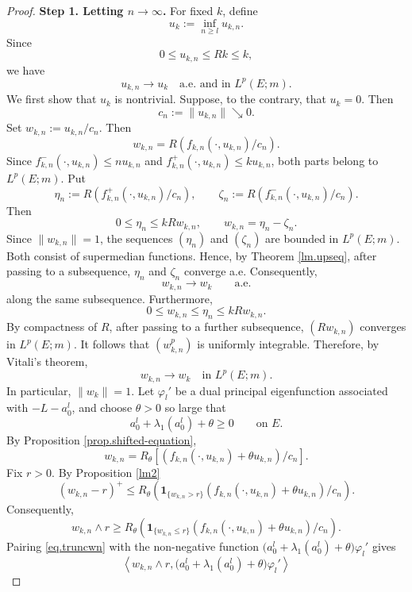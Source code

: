 \documentclass[10pt,a4paper]{amsart}
\begin{document}
\begin{proof}
{\bf Step 1. Letting $n\to\infty$.}  For fixed $k$, define
\[
u_k:=\inf_{n\ge l}u_{k,n}.
\]
Since
\[
0\le u_{k,n}\le Rk\le k,
\]
we have
\begin{equation}
\label{eq.untoUK}
u_{k,n}\longrightarrow u_k
\quad\text{a.e. and in }L^p(E;m).
\end{equation}
We first show that $u_k$ is nontrivial. Suppose, to the contrary,
that $u_k=0$. Then
\[
c_n:=\|u_{k,n}\|\searrow0.
\]
Set $w_{k,n}:=u_{k,n}/c_n$. Then 
\[
w_{k,n}
=
R\left(f_{k,n}(\cdot,u_{k,n})/c_n
\right).
\]
Since $f_{k,n}^-(\cdot,u_{k,n})\le n u_{k,n}$ and
$f_{k,n}^+(\cdot,u_{k,n})\le k u_{k,n} $, both parts belong to
$L^p(E;m)$.
Put
\[
\eta_n
:=
R\left(
f_{k,n}^+(\cdot,u_{k,n})/c_n
\right),
\qquad
\zeta_n
:=
R\left(
f_{k,n}^-(\cdot,u_{k,n})/c_n
\right).
\]
Then
\[
0\le \eta_n\le kRw_{k,n},
\qquad
w_{k,n}=\eta_n-\zeta_n.
\]
Since $\|w_{k,n}\|=1$, the sequences $(\eta_n)$ and $(\zeta_n)$ are
bounded in $L^p(E;m)$. Both consist of supermedian functions.
Hence, by Theorem \ref{lm.upseq}, after passing to a subsequence,
$\eta_n$ and $\zeta_n$ converge a.e. Consequently,
\[
w_{k,n}\longrightarrow w_k
\qquad\text{a.e.}
\]
along the same subsequence.
Furthermore,
\[
0\le w_{k,n}\le \eta_n\le kRw_{k,n}.
\]
By compactness of $R$, after passing to a further subsequence,
$(Rw_{k,n})$ converges in $L^p(E;m)$. It follows that
$(w_{k,n}^p)$ is uniformly integrable. Therefore, by Vitali's
theorem,
\begin{equation}
\label{eq.wnstrong}
w_{k,n}\longrightarrow w_k
\quad\text{in }L^p(E;m).
\end{equation}
In particular, $\|w_k\|=1$.
Let $\varphi_l'$ be a dual principal eigenfunction associated with
$-L-a_0^l$, and choose $\theta>0$ so large that
\[
a_0^l+\lambda_1(a_0^l)+\theta\ge0
\qquad\text{on }E.
\]
By Proposition \ref{prop.shifted-equation},
\[
w_{k,n}
=
R_\theta \left [(f_{k,n}(\cdot,u_{k,n})+\theta u_{k,n})/c_n\right].
\]
Fix $r>0$. By Proposition \ref{lm2}
\[
(w_{k,n}-r)^+
\le
R_\theta
\left(
\mathbf1_{\{w_{k,n}>r\}}(f_{k,n}(\cdot,u_{k,n})+\theta u_{k,n})/c_n
\right).
\]
Consequently,
\begin{equation}
\label{eq.truncwn}
w_{k,n}\wedge r
\ge
R_\theta
\left(
\mathbf1_{\{w_{k,n}\le r\}}(f_{k,n}(\cdot,u_{k,n})+\theta u_{k,n})/c_n
\right).
\end{equation}
Pairing  \eqref{eq.truncwn} with the non-negative function $\bigl(a_0^l+\lambda_1(a_0^l)+\theta\bigr)\varphi_l'$ gives
\begin{equation}
\label{eq.truncpair}
\left\langle w_{k,n}\wedge r,\bigl(a_0^l+\lambda_1(a_0^l)+\theta\bigr)\varphi_l'\right\rangle

\end{equation}
\end{proof}
\end{document}
